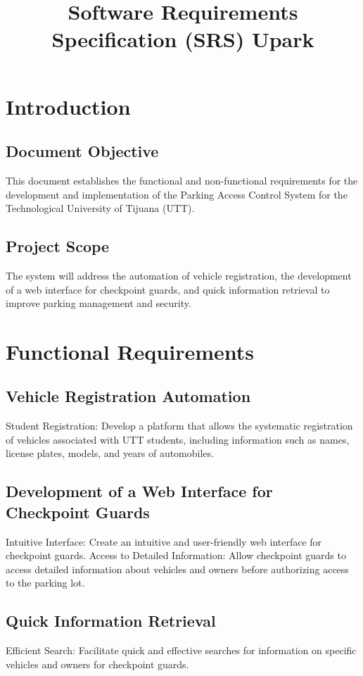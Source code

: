 \documentclass{article}
\title{Software Requirements Specification (SRS) Upark}
\begin{document}
\maketitle


\section{Introduction}

\subsection {Document Objective}
This document establishes the functional and non-functional requirements for the development and implementation of the Parking Access Control System for the Technological University of Tijuana (UTT).

\subsection {Project Scope}
The system will address the automation of vehicle registration, the development of a web interface for checkpoint guards, and quick information retrieval to improve parking management and security.

\section{Functional Requirements}

\subsection{Vehicle Registration Automation}
Student Registration: Develop a platform that allows the systematic registration of vehicles associated with UTT students, including information such as names, license plates, models, and years of automobiles.

\subsection{Development of a Web Interface for Checkpoint Guards}
Intuitive Interface: Create an intuitive and user-friendly web interface for checkpoint guards.
Access to Detailed Information: Allow checkpoint guards to access detailed information about vehicles and owners before authorizing access to the parking lot.

\subsection{Quick Information Retrieval}
Efficient Search: Facilitate quick and effective searches for information on specific vehicles and owners for checkpoint guards.
\end{document}
